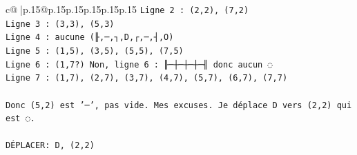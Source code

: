 \documentclass{article}
\begin{document}
{\begin{supertabular}{c@{$\;$}|p{.15\linewidth}@{}p{.15\linewidth}p{.15\linewidth}p{.15\linewidth}p{.15\linewidth}p{.15\linewidth}}
{{{\texttt{Ligne 2 : (2,2), (7,2)} \\
\texttt{Ligne 3 : (3,3), (5,3)} \\
\texttt{Ligne 4 : aucune (╟,─,┐,D,┌,─,┤,O)} \\
\texttt{Ligne 5 : (1,5), (3,5), (5,5), (7,5)} \\
\texttt{Ligne 6 : (1,7?) Non, ligne 6 : ╟─┼─┼─┼─╢ donc aucun ◌} \\
\texttt{Ligne 7 : (1,7), (2,7), (3,7), (4,7), (5,7), (6,7), (7,7)} \\
\\ 
\texttt{Donc (5,2) est '─', pas vide. Mes excuses. Je déplace D vers (2,2) qui est ◌.} \\
\\ 
\texttt{DÉPLACER: D, (2,2)} \\
            }
        }
    }
     \\ \\


\end{supertabular}}
\end{document}

